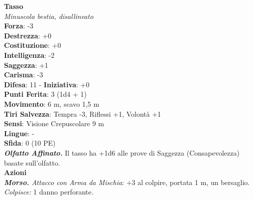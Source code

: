 \begin{multicols}{2}
\medskip\textbf{Tasso}\\
\emph{Minuscola bestia, disallineato}\\
\textbf{Forza}: -3\\
\textbf{Destrezza}: +0\\
\textbf{Costituzione}: +0\\
\textbf{Intelligenza}: -2\\
\textbf{Saggezza}: +1\\
\textbf{Carisma}: -3\\
\textbf{Difesa}: 11 - \textbf{Iniziativa}: +0\\
\textbf{Punti Ferita}: 3 (1d4 + 1)\\
\textbf{Movimento}: 6 m, scavo 1,5 m\\
\textbf{Tiri Salvezza}: Tempra -3, Riflessi +1, Volontà +1\\
\textbf{Sensi}: Visione Crepuscolare 9 m\\
\textbf{Lingue}: -\\
\textbf{Sfida}: 0 (10 PE)\smallskip\\
\emph{\textbf{Olfatto Affinato.}} Il tasso ha +1d6 alle prove di Saggezza (Consapevolezza) basate sull'olfatto.\\
\smallskip\textbf{Azioni}\\
\emph{\textbf{Morso.} Attacco con Arma da Mischia}: +3 al colpire, portata 1 m, un bersaglio.\\
\emph{Colpisce:} 1 danno perforante.\\


\end{multicols}
